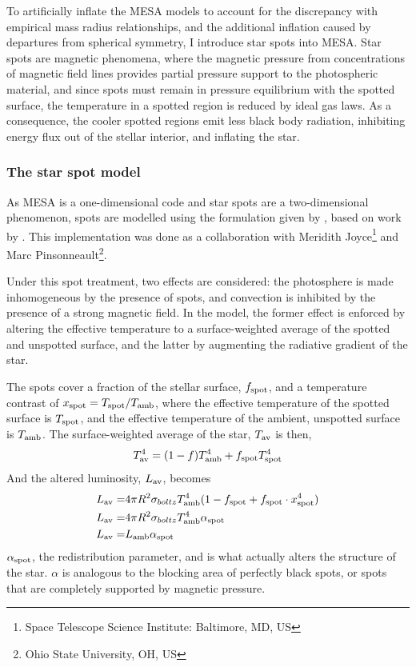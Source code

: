 To artificially inflate the MESA models to account for the discrepancy with empirical mass radius relationships, and the additional inflation caused by departures from spherical symmetry, I introduce star spots into MESA.
Star spots are magnetic phenomena, where the magnetic pressure from concentrations of magnetic field lines provides partial pressure support to the photospheric material, and since spots must remain in pressure equilibrium with the spotted surface, the temperature in a spotted region is reduced by ideal gas laws. As a consequence, the cooler spotted regions emit less black body radiation, inhibiting energy flux out of the stellar interior, and inflating the star.

\subsubsection{The star spot model}
\label{setc:modelling:star spot model description}

As MESA is a one-dimensional code and star spots are a two-dimensional phenomenon, spots are modelled using the formulation given by \citet{sommers2015}, based on work by \citet{spruit1986}.
This implementation was done as a collaboration with Meridith Joyce\footnote{Space Telescope Science Institute: Baltimore, MD, US} and Marc Pinsonneault\footnote{Ohio State University, OH, US}.

Under this spot treatment, two effects are considered: the photosphere is made inhomogeneous by the presence of spots, and convection is inhibited by the presence of a strong magnetic field.
In the \citet{sommers2015} model, the former effect is enforced by altering the effective temperature to a surface-weighted average of the spotted and unspotted surface, and the latter by augmenting the radiative gradient of the star.

The spots cover a fraction of the stellar surface, $f_{\rm spot}$, and a temperature contrast of $x_{\rm spot} = T_{\rm  spot} / T_{\rm amb}$, where the effective temperature of the spotted surface is $T_{\rm spot}$, and the effective temperature of the ambient, unspotted surface is $T_{\rm amb}$. The surface-weighted average of the star, $T_{\rm av}$ is then,
\begin{equation}
    \label{eqn:modelling:surface weighted average temp}
    T_{\rm av}^4 = (1-f) T_{\rm amb}^4 + f_{\rm spot} T_{\rm spot}^4
\end{equation}
And the altered luminosity, $L_{\rm av}$, becomes
\begin{align}
    L_{\rm av} =& 4\pi R^2 \sigma_{boltz} T_{\rm amb}^4 (1 - f_{\rm spot} + f_{\rm spot} \cdot x_{\rm spot}^4) \\
    L_{\rm av} =& 4\pi R^2 \sigma_{boltz} T_{\rm amb}^4 \alpha_{\rm spot} \\
    L_{\rm av} =& L_{\rm amb} \alpha_{\rm spot}
\end{align}
$\alpha_{\rm spot}$, the redistribution parameter, and is what actually alters the structure of the star. $\alpha$ is analogous to the blocking area of perfectly black spots, or spots that are completely supported by magnetic pressure.


